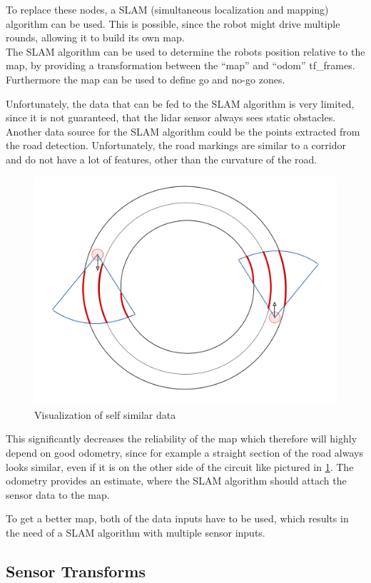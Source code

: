 To replace these nodes, a SLAM (simultaneous localization and mapping) algorithm can be used.
This is possible, since the robot might drive multiple rounds, allowing it to build its own map.\\

The SLAM algorithm can be used to determine the robots position relative to the map, by providing a transformation between the ``map'' and ``odom'' tf\_frames. Furthermore the map can be used to define go and no-go zones.

Unfortunately, the data that can be fed to the SLAM algorithm is very limited, since it is not guaranteed, that the lidar sensor always sees static obstacles. Another data source for the SLAM algorithm could be the points extracted from the road detection. Unfortunately, the road markings are similar to a corridor and do not have a lot of features, other than the curvature of the road.\\

\begin{figure} 
	\centering
	\includegraphics[width=.5\textwidth]{Pictures/selfsimillar}
	\caption{Visualization of self similar data}
	\label{selfsimilar}
\end{figure}

This significantly decreases the reliability of the map which therefore will highly depend on good odometry, since for example a straight section of the road always looks similar, even if it is on the other side of the circuit like pictured in \ref{selfsimilar}. The odometry provides an estimate, where the SLAM algorithm should attach the sensor data to the map.

To get a better map, both of the data inputs have to be used, which results in the need of a SLAM algorithm with multiple sensor inputs.\\

\subsection{Sensor Transforms}

